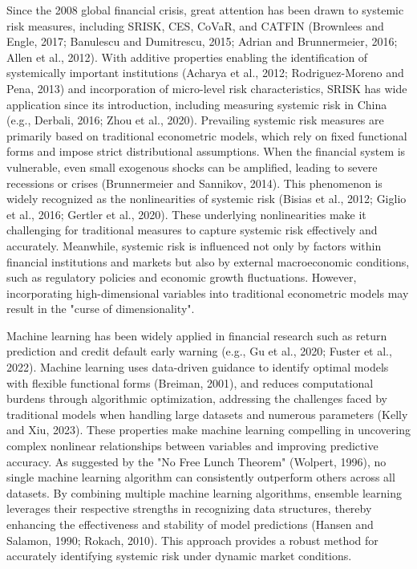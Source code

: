 \documentclass[12pt,a4paper]{article}
\begin{document}
    Since the 2008 global financial crisis, great attention has been drawn to systemic risk measures, including SRISK, CES, CoVaR, and CATFIN (Brownlees and Engle, 2017; Banulescu and Dumitrescu, 2015; Adrian and Brunnermeier, 2016; Allen et al., 2012). With additive properties enabling the identification of systemically important institutions (Acharya et al., 2012; Rodriguez-Moreno and Pena, 2013) and incorporation of micro-level risk characteristics, SRISK has wide application since its introduction, including measuring systemic risk in China (e.g., Derbali, 2016; Zhou et al., 2020). Prevailing systemic risk measures are primarily based on traditional econometric models, which rely on fixed functional forms and impose strict distributional assumptions. When the financial system is vulnerable, even small exogenous shocks can be amplified, leading to severe recessions or crises (Brunnermeier and Sannikov, 2014). This phenomenon is widely recognized as the nonlinearities of systemic risk (Bisias et al., 2012; Giglio et al., 2016; Gertler et al., 2020). These underlying nonlinearities make it challenging for traditional measures to capture systemic risk effectively and accurately. Meanwhile, systemic risk is influenced not only by factors within financial institutions and markets but also by external macroeconomic conditions, such as regulatory policies and economic growth fluctuations. However, incorporating high-dimensional variables into traditional econometric models may result in the "curse of dimensionality".

    Machine learning has been widely applied in financial research such as return prediction and credit default early warning (e.g., Gu et al., 2020; Fuster et al., 2022). Machine learning uses data-driven guidance to identify optimal models with flexible functional forms (Breiman, 2001), and reduces computational burdens through algorithmic optimization, addressing the challenges faced by traditional models when handling large datasets and numerous parameters (Kelly and Xiu, 2023). These properties make machine learning compelling in uncovering complex nonlinear relationships between variables and improving predictive accuracy. As suggested by the "No Free Lunch Theorem" (Wolpert, 1996), no single machine learning algorithm can consistently outperform others across all datasets. By combining multiple machine learning algorithms, ensemble learning leverages their respective strengths in recognizing data structures, thereby enhancing the effectiveness and stability of model predictions (Hansen and Salamon, 1990; Rokach, 2010). This approach provides a robust method for accurately identifying systemic risk under dynamic market conditions.
\end{document}
